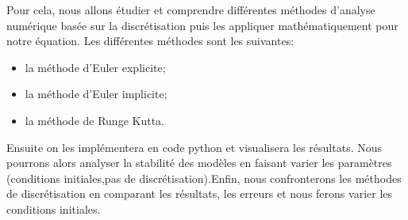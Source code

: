 Pour cela, nous allons étudier et comprendre différentes méthodes d'analyse numérique basée sur la discrétisation puis les appliquer mathématiquement pour notre équation.
\newline
Les différentes méthodes sont les suivantes:
\begin{itemize}
    \item la méthode d'Euler explicite;
    \item la méthode d'Euler implicite;
    \item la méthode de Runge Kutta.
\end{itemize}
Ensuite on les implémentera en code python et visualisera les résultats. Nous pourrons alors analyser la stabilité des modèles en faisant varier les paramètres (conditions initiales,pas de discrétisation).Enfin, nous confronterons les méthodes de discrétisation en comparant les résultats, les erreurs et nous ferons varier les conditions initiales.\\


